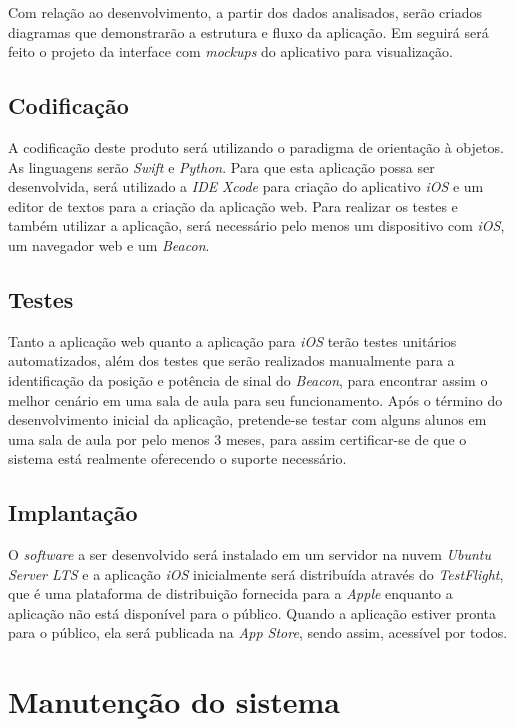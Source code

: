 \documentclass[
	12pt,
	oneside,
	a4paper,
	english,
	brazil,
]{abntex2}
\begin{document}
Com relação ao desenvolvimento, a partir dos dados analisados, serão criados diagramas que demonstrarão a estrutura e fluxo da aplicação. Em seguirá será feito o projeto da interface com \emph{mockups} do aplicativo para visualização.

\subsection{Codificação}

A codificação deste produto será utilizando o paradigma de orientação à objetos. As linguagens serão \emph{Swift} e \emph{Python}. Para que esta aplicação possa ser desenvolvida, será utilizado a \emph{IDE} \emph{Xcode} para criação do aplicativo \emph{iOS} e um editor de textos para a criação da aplicação web. Para realizar os testes e também utilizar a aplicação, será necessário pelo menos um dispositivo com \emph{iOS}, um navegador web e um \emph{Beacon}.

\subsection{Testes}

Tanto a aplicação web quanto a aplicação para \emph{iOS} terão testes unitários automatizados, além dos testes que serão realizados manualmente para a identificação da posição e potência de sinal do \emph{Beacon}, para encontrar assim o melhor cenário em uma sala de aula para seu funcionamento. Após o término do desenvolvimento inicial da aplicação, pretende-se testar com alguns alunos em uma sala de aula por pelo menos 3 meses, para assim certificar-se de que o sistema está realmente oferecendo o suporte necessário.

\subsection{Implantação}

O \emph{software} a ser desenvolvido será instalado em um servidor na nuvem \emph{Ubuntu Server LTS} e a aplicação \emph{iOS} inicialmente será distribuída através do \emph{TestFlight}, que é uma plataforma de distribuição fornecida para a \emph{Apple} enquanto a aplicação não está disponível para o público. Quando a aplicação estiver pronta para o público, ela será publicada na \emph{App Store}, sendo assim, acessível por todos.

\section{Manutenção do sistema}
\end{document}
